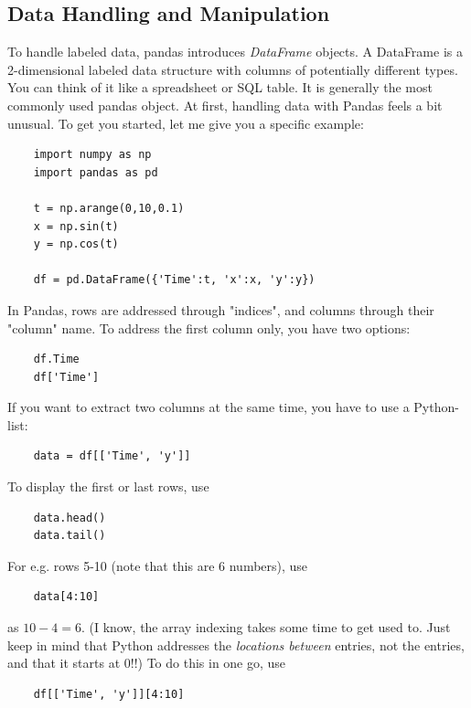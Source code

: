 \subsection{Data Handling and Manipulation}


To handle labeled data, pandas introduces \emph{DataFrame} objects. A DataFrame is a 2-dimensional labeled data structure with columns of potentially different types. You can think of it like a spreadsheet or SQL table. It is generally the most commonly used pandas object.
At first, handling data with Pandas feels a bit unusual. To get you started, let me give you a specific example:

\begin{lstlisting}
    import numpy as np
    import pandas as pd

    t = np.arange(0,10,0.1)
    x = np.sin(t)
    y = np.cos(t)

    df = pd.DataFrame({'Time':t, 'x':x, 'y':y})
\end{lstlisting}

In Pandas, rows are addressed through "indices", and columns through their "column" name.
To address the first column only, you have two options:

\begin{lstlisting}
    df.Time
    df['Time']
\end{lstlisting}

If you want to extract two columns at the same time, you have to use a Python-list:

\begin{lstlisting}
    data = df[['Time', 'y']]
\end{lstlisting}

To display the first or last rows, use

\begin{lstlisting}
    data.head()
    data.tail()
\end{lstlisting}

For e.g. rows 5-10 (note that this are 6 numbers), use

\begin{lstlisting}
    data[4:10]
\end{lstlisting}

as $10-4=6$. (I know, the array indexing takes some time to get used to. Just keep in mind that Python addresses the \emph{locations between} entries, not the entries, and that it starts at $0$!!) To do this in one go, use

\begin{lstlisting}
    df[['Time', 'y']][4:10]
\end{lstlisting}

